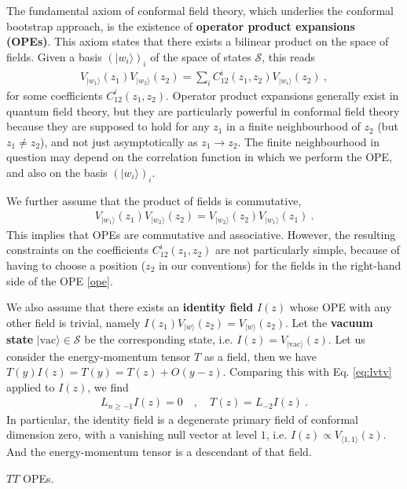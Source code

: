 \documentclass[12pt, a4paper]{article}
\theoremstyle{break}
\begin{document}
The fundamental axiom of conformal field theory, which underlies the conformal bootstrap approach, is the existence of \textbf{operator product expansions (OPEs)}. This axiom states that there exists a bilinear product on the space of fields. Given a basis $(|w_i\rangle)_i$ of the space of states $\mathcal{S}$, this reads 
\begin{align}
  \boxed{V_{|w_1\rangle}(z_1)V_{|w_2\rangle}(z_2) = \sum_i C^i_{12}(z_1,z_2) V_{|w_i\rangle}(z_2)}\ ,
  \label{ope}
 \end{align}
for some coefficients $C^i_{12}(z_1,z_2)$. Operator product expansions generally exist in quantum field theory, but they are particularly powerful in conformal field theory because they are supposed to hold for any $z_1$ in a finite neighbourhood of $z_2$ (but $z_1\neq z_2$), and not just asymptotically as $z_1\to z_2$. The finite neighbourhood in question may depend on the correlation function in which we perform the OPE, and also on the basis $(|w_i\rangle)_i$. 

We further assume that the product of fields is commutative,
\begin{align}
 \boxed{V_{|w_1\rangle}(z_1)V_{|w_2\rangle}(z_2) = V_{|w_2\rangle}(z_2)V_{|w_1\rangle}(z_1)}\ .
\end{align}
This implies that OPEs are commutative and associative. However, the resulting constraints on the coefficients $C^i_{12}(z_1,z_2)$ are not particularly simple, because of having to choose a position ($z_2$ in our conventions) for the fields in the right-hand side of the OPE \eqref{ope}. 

We also assume that there exists an \textbf{identity field} $I(z)$ whose OPE with any other field is trivial, namely $I(z_1)V_{|w\rangle}(z_2) = V_{|w\rangle}(z_2)$. Let the \textbf{vacuum state} $|\text{vac}\rangle\in \mathcal{S}$ be the corresponding state, i.e. $I(z) = V_{|\text{vac}\rangle}(z)$. Let us consider the energy-momentum tensor $T$ as a field, then we have 
$
 T(y)I(z) = T(y) = T(z)  + O(y-z)
$. 
Comparing this with Eq. \eqref{eq:lvtv} applied to $I(z)$, we find 
\begin{align}
 L_{n\geq -1} I(z) = 0 \quad , \quad T(z) = L_{-2}I(z)\ .
\end{align}
In particular, the identity field is a degenerate primary field of conformal dimension zero, with a vanishing null vector at level $1$, i.e. $I(z) \propto V_{\langle 1,1\rangle}(z)$. And the energy-momentum tensor is a descendant of that field.


$TT$ OPEs. 
\end{document}
